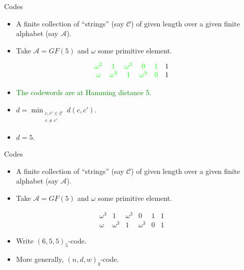 \documentclass{beamer}
\newcommand{\A}{\mathcal{A}}
\newcommand{\C}{\mathscr{C}}
\newcommand{\ggreen}[1]{\textcolor{green}{#1}}
\begin{document}
 
  \begin{frame}{Codes}
 
 \begin{itemize}
  \item A finite collection of ``strings'' (say $\C$) of given length over a given finite alphabet (say $\A$).
  \item Take $\A = GF(5)$ and $\omega$ some primitive element.
 \end{itemize}
 
 \[
  \begin{array}{cccccc}
\ggreen{\omega^3} & \ggreen{1} & \ggreen{\omega^3} & \ggreen{0} & \ggreen{1} & 1 \\
\ggreen{\omega} & \ggreen{\omega^3} & \ggreen{1} & \ggreen{\omega^3} & \ggreen{0} & 1
  \end{array}
 \]
 
 \begin{itemize}
  \item \ggreen{The codewords are at Hamming distance 5.}
  \item\pause $d=\min_{\begin{smallmatrix} c,c' \in \C \\ c \neq c' \end{smallmatrix}}d(c,c')$.
  \item\pause $d=5$.
 \end{itemize}
 
 \end{frame}
 
 
  \begin{frame}{Codes}
 
 \begin{itemize}
  \item A finite collection of ``strings'' (say $\C$) of given length over a given finite alphabet (say $\A$).
  \item Take $\A = GF(5)$ and $\omega$ some primitive element.
 \end{itemize}
 
 \[
  \begin{array}{cccccc}
\omega^3 & 1 & \omega^3 & 0 & 1 & 1 \\
\omega & \omega^3 & 1 & \omega^3 & 0 & 1
  \end{array}
 \]
 
 \begin{itemize}
  \item Write $(6,5,5)_5$-code. \pause
  \item More generally, $(n,d,w)_q$-code.
 \end{itemize}
 
 \end{frame}
\end{document}
